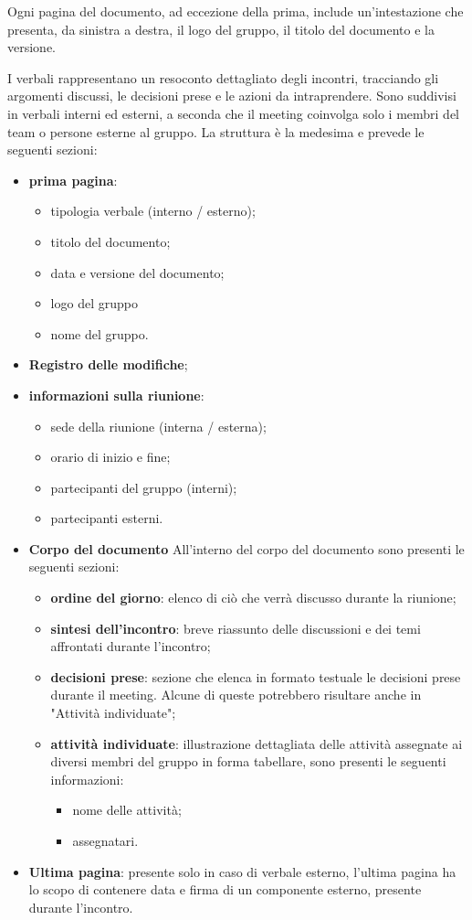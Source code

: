 Ogni pagina del documento, ad eccezione della prima, include un'intestazione che presenta, da sinistra a destra, il logo del gruppo, il titolo del documento e la versione.

I verbali rappresentano un resoconto dettagliato degli incontri, tracciando gli argomenti discussi, le decisioni prese e le azioni da intraprendere. Sono suddivisi in verbali interni ed esterni, a seconda che il meeting coinvolga solo i membri del team o persone esterne al gruppo.
La struttura è la medesima e prevede le seguenti sezioni:
\begin{itemize}
	\item \textbf{prima pagina}:
		\begin{itemize}
			\item tipologia verbale (interno / esterno);
			\item titolo del documento;
			\item data e versione del documento;
			\item logo del gruppo
			\item nome del gruppo.
		\end{itemize}
	\item \textbf{Registro delle modifiche};
	\item \textbf{informazioni sulla riunione}:
		\begin{itemize}
			\item sede della riunione (interna / esterna);
			\item orario di inizio e fine;
			\item partecipanti del gruppo (interni);
			\item partecipanti esterni.
		\end{itemize}
	\item \textbf{Corpo del documento}
		All'interno del corpo del documento sono presenti le seguenti sezioni:
		\begin{itemize}
			\item \textbf{ordine del giorno}:
					elenco di ciò che verrà discusso durante la riunione;
			\item \textbf{sintesi dell'incontro}:
					breve riassunto delle discussioni e dei temi affrontati durante l'incontro;
			\item \textbf{decisioni prese}:
					sezione che elenca in formato testuale le decisioni prese durante il meeting. Alcune di queste potrebbero risultare anche in "Attività individuate";
			\item \textbf{attività individuate}:
					illustrazione dettagliata delle attività assegnate ai diversi membri del gruppo in forma tabellare, sono presenti le seguenti informazioni:
					\begin{itemize}
						\item nome delle attività;
						\item assegnatari.
					\end{itemize}
		\end{itemize}
	\item \textbf{Ultima pagina}: presente solo in caso di verbale esterno, l'ultima pagina ha lo scopo di contenere data e firma di un componente esterno, presente durante l'incontro.
\end{itemize}
